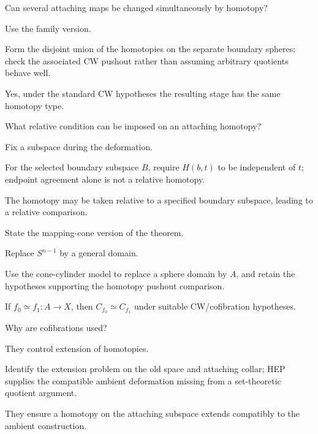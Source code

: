 \begin{exercise}\label{exr:viii08-10}
Can several attaching maps be changed simultaneously by homotopy?
\end{exercise}
\begin{hint}
Use the family version.

Form the disjoint union of the homotopies on the separate boundary spheres; check the associated CW pushout rather than assuming arbitrary quotients behave well.
\end{hint}
\begin{solution}
Yes, under the standard CW hypotheses the resulting stage has the same homotopy type.
\end{solution}

\begin{exercise}\label{exr:viii08-11}
What relative condition can be imposed on an attaching homotopy?
\end{exercise}
\begin{hint}
Fix a subspace during the deformation.

For the selected boundary subspace \(B\), require \(H(b,t)\) to be independent of \(t\); endpoint agreement alone is not a relative homotopy.
\end{hint}
\begin{solution}
The homotopy may be taken relative to a specified boundary subspace, leading to a relative comparison.
\end{solution}

\begin{exercise}\label{exr:viii08-12}
State the mapping-cone version of the theorem.
\end{exercise}
\begin{hint}
Replace \(S^{n-1}\) by a general domain.

Use the cone-cylinder model to replace a sphere domain by \(A\), and retain the hypotheses supporting the homotopy pushout comparison.
\end{hint}
\begin{solution}
If \(f_0\simeq f_1:A\to X\), then \(C_{f_0}\simeq C_{f_1}\) under suitable CW/cofibration hypotheses.
\end{solution}

\begin{exercise}\label{exr:viii08-13}
Why are cofibrations used?
\end{exercise}
\begin{hint}
They control extension of homotopies.

Identify the extension problem on the old space and attaching collar; HEP supplies the compatible ambient deformation missing from a set-theoretic quotient argument.
\end{hint}
\begin{solution}
They ensure a homotopy on the attaching subspace extends compatibly to the ambient construction.
\end{solution}

